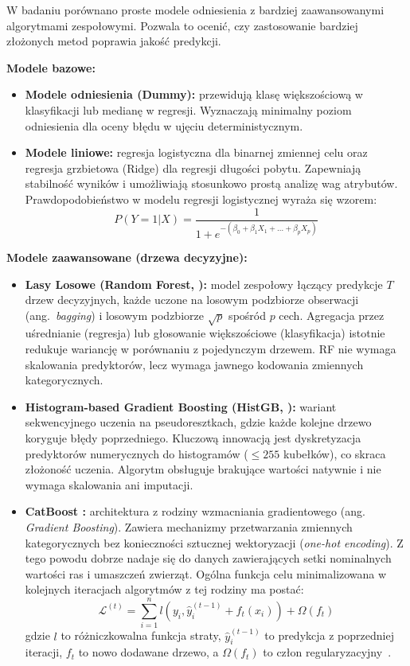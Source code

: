 W badaniu porównano proste modele odniesienia z bardziej zaawansowanymi algorytmami zespołowymi. Pozwala to ocenić, czy zastosowanie bardziej złożonych metod poprawia jakość predykcji.

\textbf{Modele bazowe:}

\begin{itemize}\itemsep2pt
\item \textbf{Modele odniesienia (Dummy):} przewidują klasę większościową w klasyfikacji lub medianę w regresji. Wyznaczają minimalny poziom odniesienia dla oceny błędu w ujęciu deterministycznym.
\item \textbf{Modele liniowe:} regresja logistyczna dla binarnej zmiennej celu oraz regresja grzbietowa (Ridge) dla regresji długości pobytu. Zapewniają stabilność wyników i umożliwiają stosunkowo prostą analizę wag atrybutów. Prawdopodobieństwo w modelu regresji logistycznej wyraża się wzorem:
\begin{equation}
P(Y=1|X) = \frac{1}{1 + e^{-(\beta_0 + \beta_1 X_1 + \dots + \beta_p X_p)}}
\end{equation}
\end{itemize}

\textbf{Modele zaawansowane (drzewa decyzyjne):}

\begin{itemize}\itemsep2pt
\item \textbf{Lasy Losowe (Random Forest, \cite{Breiman2001}):} model zespołowy łączący predykcje $T$ drzew decyzyjnych, każde uczone na losowym podzbiorze obserwacji (ang.\ \emph{bagging}) i losowym podzbiorze $\sqrt{p}$ spośród $p$ cech. Agregacja przez uśrednianie (regresja) lub głosowanie większościowe (klasyfikacja) istotnie redukuje wariancję w porównaniu z pojedynczym drzewem. RF nie wymaga skalowania predyktorów, lecz wymaga jawnego kodowania zmiennych kategorycznych.
\item \textbf{Histogram-based Gradient Boosting (HistGB, \cite{Ke2017,Friedman2001}):} wariant sekwencyjnego uczenia na pseudoresztkach, gdzie każde kolejne drzewo koryguje błędy poprzedniego. Kluczową innowacją jest dyskretyzacja predyktorów numerycznych do histogramów ($\leq 255$ kubełków), co skraca złożoność uczenia. Algorytm obsługuje brakujące wartości natywnie i nie wymaga skalowania ani imputacji.
\item \textbf{CatBoost \cite{Prokhorenkova2018}:} architektura z rodziny wzmacniania gradientowego (ang. \emph{Gradient Boosting}). Zawiera mechanizmy przetwarzania zmiennych kategorycznych bez konieczności sztucznej wektoryzacji (\emph{one-hot encoding}). Z tego powodu dobrze nadaje się do danych zawierających setki nominalnych wartości ras i umaszczeń zwierząt. Ogólna funkcja celu minimalizowana w kolejnych iteracjach algorytmów z tej rodziny ma postać:
\begin{equation}
\mathcal{L}^{(t)} = \sum_{i=1}^n l(y_i, \hat{y}_i^{(t-1)} + f_t(x_i)) + \Omega(f_t)
\end{equation}
gdzie $l$ to różniczkowalna funkcja straty, $\hat{y}_i^{(t-1)}$ to predykcja z poprzedniej iteracji, $f_t$ to nowo dodawane drzewo, a $\Omega(f_t)$ to człon regularyzacyjny~\cite{Friedman2001}.
\end{itemize}

